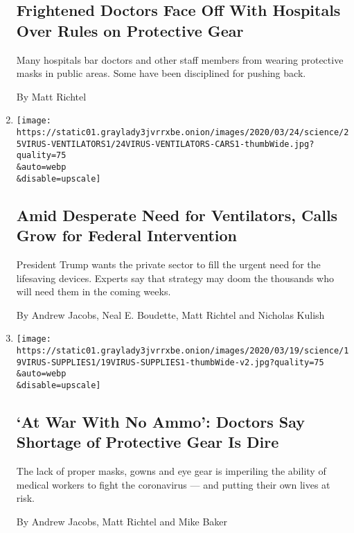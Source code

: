 \begin{enumerate}
  \hypertarget{frightened-doctors-face-off-with-hospitals-over-rules-on-protective-gear}{%
  \subsection{Frightened Doctors Face Off With Hospitals Over Rules on
  Protective
  Gear}\label{frightened-doctors-face-off-with-hospitals-over-rules-on-protective-gear}}

  Many hospitals bar doctors and other staff members from wearing
  protective masks in public areas. Some have been disciplined for
  pushing back.

  By Matt Richtel
\item
  \href{/2020/03/25/health/ventilators-coronavirus.html}{}

  \texttt{[image: https://static01.graylady3jvrrxbe.onion/images/2020/03/24/science/25VIRUS-VENTILATORS1/24VIRUS-VENTILATORS-CARS1-thumbWide.jpg?quality=75\\\&auto=webp\\\&disable=upscale]}

  \hypertarget{amid-desperate-need-for-ventilators-calls-grow-for-federal-intervention}{%
  \subsection{Amid Desperate Need for Ventilators, Calls Grow for
  Federal
  Intervention}\label{amid-desperate-need-for-ventilators-calls-grow-for-federal-intervention}}

  President Trump wants the private sector to fill the urgent need for
  the lifesaving devices. Experts say that strategy may doom the
  thousands who will need them in the coming weeks.

  By Andrew Jacobs, Neal E. Boudette, Matt Richtel and Nicholas Kulish
\item
  \href{/2020/03/19/health/coronavirus-masks-shortage.html}{}

  \texttt{[image: https://static01.graylady3jvrrxbe.onion/images/2020/03/19/science/19VIRUS-SUPPLIES1/19VIRUS-SUPPLIES1-thumbWide-v2.jpg?quality=75\\\&auto=webp\\\&disable=upscale]}

  \hypertarget{at-war-with-no-ammo-doctors-say-shortage-of-protective-gear-is-dire}{%
  \subsection{`At War With No Ammo': Doctors Say Shortage of Protective
  Gear Is
  Dire}\label{at-war-with-no-ammo-doctors-say-shortage-of-protective-gear-is-dire}}

  The lack of proper masks, gowns and eye gear is imperiling the ability
  of medical workers to fight the coronavirus --- and putting their own
  lives at risk.

  By Andrew Jacobs, Matt Richtel and Mike Baker
\end{enumerate}

